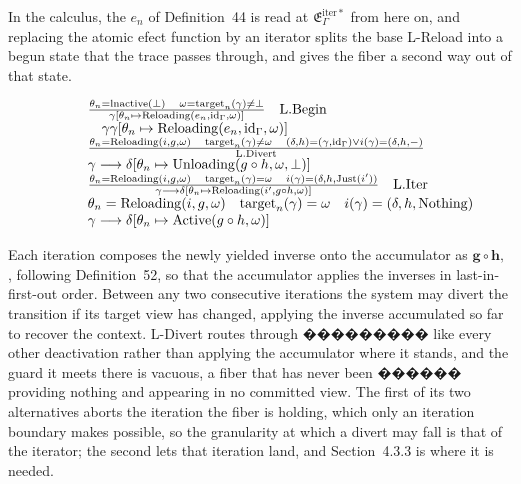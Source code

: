 \documentclass[
  10
]{article}
\begin{document}
In the calculus, the \(e _ { n }\) of Definition~44 is read at
\(\mathfrak { E } _ { \Gamma } ^ { \mathrm { i t e r * } }\) from here
on, and replacing the atomic efect function by an iterator splits the
base L-Reload into a begun state that the trace passes through, and
gives the fiber a second way out of that state.

\[
\begin{array} { r l } & { \qquad \frac { \theta _ { n } = \mathrm { l n a c t i v e } ( \perp ) \quad \omega = \mathrm { t a r g e t } _ { n } ( \gamma ) \neq \perp } { \gamma [ \theta _ { n } \mapsto \mathrm { R e l o a d i n g } ( e _ { n } , \mathrm { i } \mathrm { d } _ { \Gamma } , \omega ) ] } \quad \mathrm { L . B e g i n } } \\ & { \qquad \quad \gamma  \gamma [ \theta _ { n } \mapsto \mathrm { R e l o a d i n g } ( e _ { n } , \mathrm { i } \mathrm { d } _ { \Gamma } , \omega ) ] } \\ & { \qquad \frac { \theta _ { n } = \mathrm { R e l o a d i n g } ( i , g , \omega ) \quad \mathrm { t a r g e t } _ { n } ( \gamma ) \neq \omega \quad ( \delta , h ) = ( \gamma , \mathrm { i d } _ { \Gamma } ) \vee i ( \gamma ) = ( \delta , h , - ) } { \mathrm { L . D i v e r t } } } \\ & { \qquad \gamma \longrightarrow \delta [ \theta _ { n } \mapsto \mathrm { U n l o a d i n g } ( g \circ h , \omega , \perp ) ] } \\ & { \qquad \frac { \theta _ { n } = \mathrm { R e l o a d i n g } ( i , g , \omega ) \quad \mathrm { t a r g e t } _ { n } ( \gamma ) = \omega \quad i ( \gamma ) = ( \delta , h , \mathrm { J u s t } ( i ^ { \prime } ) ) } { \gamma \longrightarrow \delta [ \theta _ { n } \mapsto \mathrm { R e l o a d i n g } ( i ^ { \prime } , g \circ h , \omega ) ] } \quad \mathrm { L . I t e r } } \\ & { \qquad \theta _ { n } = \mathrm { R e l o a d i n g } ( i , g , \omega ) \quad \mathrm { t a r g e t } _ { n } ( \gamma ) = \omega \quad i ( \gamma ) = ( \delta , h , \mathrm { N o t h i n g } ) } \\ & { \qquad \gamma \longrightarrow \delta [ \theta _ { n } \mapsto \mathrm { A c t i v e } ( g \circ h , \omega ) ] } \end{array}
\]

Each iteration composes the newly yielded inverse onto the accumulator
as \({ \boldsymbol { g } } \circ { \boldsymbol { h } } ,\) , following
Definition~52, so that the accumulator applies the inverses in
last-in-first-out order. Between any two consecutive iterations the
system may divert the transition if its target view has changed,
applying the inverse accumulated so far to recover the context. L-Divert
routes through ��������� like every other deactivation rather than
applying the accumulator where it stands, and the guard it meets there
is vacuous, a fiber that has never been ������ providing nothing and
appearing in no committed view. The first of its two alternatives aborts
the iteration the fiber is holding, which only an iteration boundary
makes possible, so the granularity at which a divert may fall is that of
the iterator; the second lets that iteration land, and Section~4.3.3 is
where it is needed.
\end{document}
